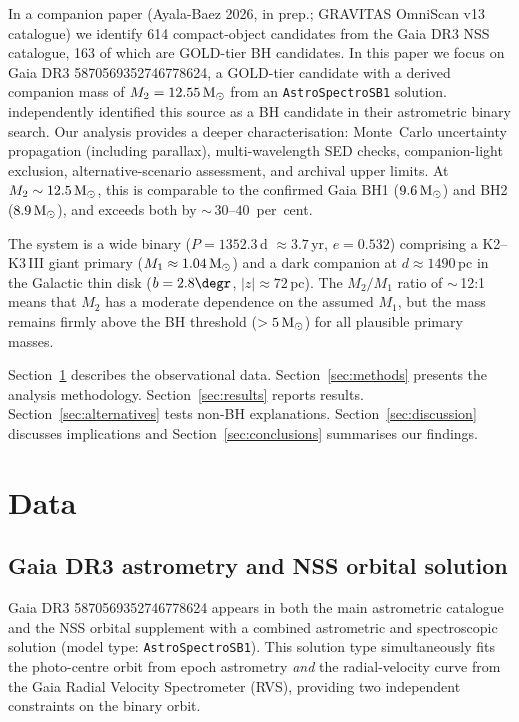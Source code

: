 \documentclass[usenatbib,fleqn]{mnras}
\newcommand{\Msun}{{\rm M}_\odot}
\begin{document}
In a companion paper (Ayala-Baez 2026, in prep.; GRAVITAS OmniScan
v13 catalogue) we identify 614 compact-object candidates from the
Gaia DR3 NSS catalogue, 163 of which are GOLD-tier BH candidates.
In this paper we focus on Gaia DR3 5870569352746778624, a
GOLD-tier candidate with a derived companion mass of
$M_2 = 12.55\,\Msun$ from an \texttt{AstroSpectroSB1} solution.
\citet{Tanikawa2023} independently identified this source as a BH
candidate in their astrometric binary search.  Our analysis
provides a deeper characterisation: Monte~Carlo uncertainty
propagation (including parallax), multi-wavelength SED checks,
companion-light exclusion, alternative-scenario assessment, and
archival upper limits.
At $M_2 \sim 12.5\,\Msun$, this is comparable to the confirmed
Gaia BH1 ($9.6\,\Msun$) and BH2 ($8.9\,\Msun$), and exceeds
both by $\sim$\,$30$--$40$~per~cent.

The system is a wide binary ($P = 1352.3$\,d $\approx 3.7$\,yr,
$e = 0.532$) comprising a K2--K3\,III giant primary
($M_1 \approx 1.04\,\Msun$) and a dark companion at
$d \approx 1490$\,pc in the Galactic thin disk
($b = 2.8\degr$, $|z| \approx 72$\,pc).  The $M_2/M_1$ ratio of
$\sim$\,12:1 means that $M_2$ has a moderate dependence on the
assumed $M_1$, but the mass remains firmly above the BH threshold
($> 5\,\Msun$) for all plausible primary masses.

Section~\ref{sec:data} describes the observational data.
Section~\ref{sec:methods} presents the analysis methodology.
Section~\ref{sec:results} reports results.
Section~\ref{sec:alternatives} tests non-BH explanations.
Section~\ref{sec:discussion} discusses implications and
Section~\ref{sec:conclusions} summarises our findings.

\section{Data}
\label{sec:data}

\subsection{Gaia DR3 astrometry and NSS orbital solution}
\label{sec:data:gaia}

Gaia DR3 5870569352746778624 appears in both the main astrometric
catalogue and the NSS orbital supplement with a combined
astrometric and spectroscopic solution (model type:
\texttt{AstroSpectroSB1}).  This solution type simultaneously fits
the photo-centre orbit from epoch astrometry \emph{and} the
radial-velocity curve from the Gaia Radial Velocity Spectrometer
(RVS), providing two independent constraints on the binary orbit.
\end{document}
